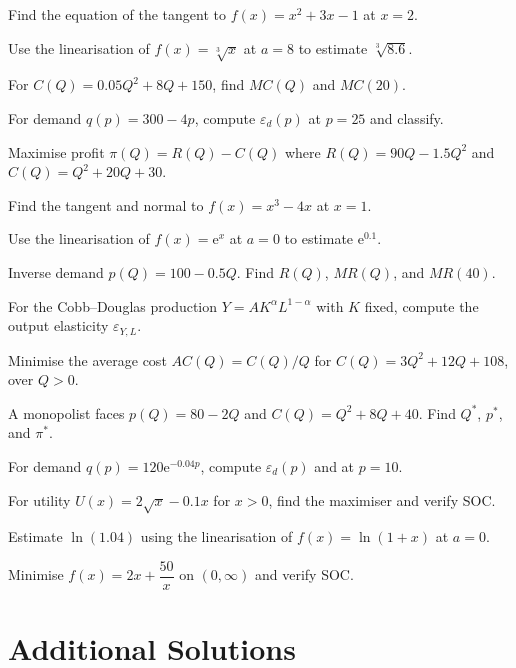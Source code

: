 \begin{problems}
  \item Find the equation of the tangent to $f(x)=x^2+3x-1$ at $x=2$.
  \item Use the linearisation of $f(x)=\sqrt[3]{x}$ at $a=8$ to estimate
        $\sqrt[3]{8.6}$.
  \item For $C(Q)=0.05Q^2+8Q+150$, find $MC(Q)$ and $MC(20)$.
  \item For demand $q(p)=300-4p$, compute $\varepsilon_d(p)$ at $p=25$ and
        classify.
  \item Maximise profit $\pi(Q)=R(Q)-C(Q)$ where $R(Q)=90Q-1.5Q^2$ and
        $C(Q)=Q^2+20Q+30$.
  \item Find the tangent and normal to $f(x)=x^3-4x$ at $x=1$.
  \item Use the linearisation of $f(x)=\mathrm{e}^{x}$ at $a=0$ to estimate
        $\mathrm{e}^{0.1}$.
  \item Inverse demand $p(Q)=100-0.5Q$. Find $R(Q)$, $MR(Q)$, and $MR(40)$.
  \item For the Cobb--Douglas production $Y=AK^{\alpha}L^{1-\alpha}$ with
        $K$ fixed, compute the output elasticity $\varepsilon_{Y,L}$.
  \item Minimise the average cost $AC(Q)=C(Q)/Q$ for
        $C(Q)=3Q^2+12Q+108$, over $Q>0$.
  \item A monopolist faces $p(Q)=80-2Q$ and $C(Q)=Q^2+8Q+40$. Find $Q^*$,
        $p^*$, and $\pi^*$.
  \item For demand $q(p)=120\mathrm{e}^{-0.04p}$, compute
        $\varepsilon_d(p)$ and at $p=10$.
  \item For utility $U(x)=2\sqrt{x}-0.1x$ for $x>0$, find the maximiser
        and verify SOC.
  \item Estimate $\ln(1.04)$ using the linearisation of $f(x)=\ln(1+x)$
        at $a=0$.
  \item Minimise $f(x)=2x+\dfrac{50}{x}$ on $(0,\infty)$ and verify SOC.
\end{problems}

\section{Additional Solutions}

